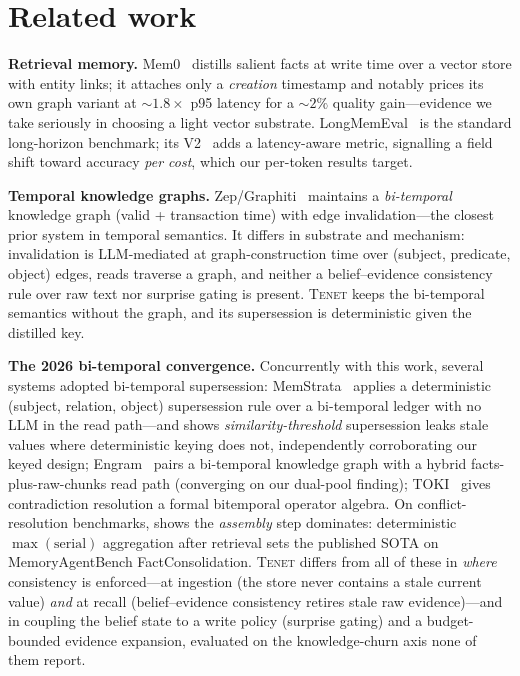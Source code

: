 \documentclass[11pt]{article}
\newcommand{\tenet}{\textsc{Tenet}}
\begin{document}
\section{Related work}\label{sec:related}
\textbf{Retrieval memory.} Mem0~\cite{mem0} distills salient facts at write time over a
vector store with entity links; it attaches only a \emph{creation} timestamp and notably
prices its own graph variant at ${\sim}1.8\times$ p95 latency for a ${\sim}2\%$ quality gain---evidence we
take seriously in choosing a light vector substrate. LongMemEval~\cite{longmemeval} is the
standard long-horizon benchmark; its V2~\cite{lmev2} adds a latency-aware metric,
signalling a field shift toward accuracy \emph{per cost}, which our per-token results
target.

\textbf{Temporal knowledge graphs.} Zep/Graphiti~\cite{zep} maintains a \emph{bi-temporal}
knowledge graph (valid + transaction time) with edge invalidation---the closest prior
system in temporal semantics. It differs in substrate and mechanism: invalidation is
LLM-mediated at graph-construction time over (subject, predicate, object) edges, reads
traverse a graph, and neither a belief--evidence consistency rule over raw text nor
surprise gating is present. \tenet{} keeps the bi-temporal semantics without the graph,
and its supersession is deterministic given the distilled key.

\textbf{The 2026 bi-temporal convergence.} Concurrently with this work, several systems
adopted bi-temporal supersession: MemStrata~\cite{memstrata} applies a deterministic
(subject, relation, object) supersession rule over a bi-temporal ledger with no LLM in
the read path---and shows \emph{similarity-threshold} supersession leaks stale values
where deterministic keying does not, independently corroborating our keyed design;
Engram~\cite{engram} pairs a bi-temporal knowledge graph with a hybrid
facts-plus-raw-chunks read path (converging on our dual-pool finding);
TOKI~\cite{toki} gives contradiction resolution a formal bitemporal operator algebra. On
conflict-resolution benchmarks, \cite{freshness} shows the \emph{assembly} step dominates:
deterministic $\max(\text{serial})$ aggregation after retrieval sets the published SOTA on
MemoryAgentBench FactConsolidation. \tenet{} differs from all of these in \emph{where}
consistency is enforced---at ingestion (the store never contains a stale current value)
\emph{and} at recall (belief--evidence consistency retires stale raw evidence)---and in
coupling the belief state to a write policy (surprise gating) and a budget-bounded
evidence expansion, evaluated on the knowledge-churn axis none of them report.
\end{document}

